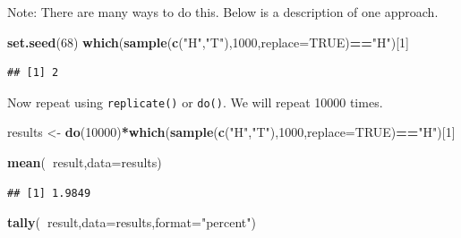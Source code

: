 \documentclass[
]{book}
\newenvironment{Shaded}{\begin{snugshade}}{\end{snugshade}}
\newcommand{\DataTypeTok}[1]{\textcolor[rgb]{0.13,0.29,0.53}{#1}}
\newcommand{\DecValTok}[1]{\textcolor[rgb]{0.00,0.00,0.81}{#1}}
\newcommand{\KeywordTok}[1]{\textcolor[rgb]{0.13,0.29,0.53}{\textbf{#1}}}
\newcommand{\NormalTok}[1]{#1}
\newcommand{\OperatorTok}[1]{\textcolor[rgb]{0.81,0.36,0.00}{\textbf{#1}}}
\newcommand{\OtherTok}[1]{\textcolor[rgb]{0.56,0.35,0.01}{#1}}
\newcommand{\StringTok}[1]{\textcolor[rgb]{0.31,0.60,0.02}{#1}}
\begin{document}
Note: There are many ways to do this. Below is a description of one approach.

\begin{Shaded}
\begin{Highlighting}[]
\KeywordTok{set.seed}\NormalTok{(}\DecValTok{68}\NormalTok{)}
\KeywordTok{which}\NormalTok{(}\KeywordTok{sample}\NormalTok{(}\KeywordTok{c}\NormalTok{(}\StringTok{"H"}\NormalTok{,}\StringTok{"T"}\NormalTok{),}\DecValTok{1000}\NormalTok{,}\DataTypeTok{replace=}\OtherTok{TRUE}\NormalTok{)}\OperatorTok{==}\StringTok{"H"}\NormalTok{)[}\DecValTok{1}\NormalTok{]}
\end{Highlighting}
\end{Shaded}

\begin{verbatim}
## [1] 2
\end{verbatim}

Now repeat using \texttt{replicate()} or \texttt{do()}. We will repeat 10000 times.

\begin{Shaded}
\begin{Highlighting}[]
\NormalTok{results <-}\StringTok{ }\KeywordTok{do}\NormalTok{(}\DecValTok{10000}\NormalTok{)}\OperatorTok{*}\KeywordTok{which}\NormalTok{(}\KeywordTok{sample}\NormalTok{(}\KeywordTok{c}\NormalTok{(}\StringTok{"H"}\NormalTok{,}\StringTok{"T"}\NormalTok{),}\DecValTok{1000}\NormalTok{,}\DataTypeTok{replace=}\OtherTok{TRUE}\NormalTok{)}\OperatorTok{==}\StringTok{"H"}\NormalTok{)[}\DecValTok{1}\NormalTok{]}
\end{Highlighting}
\end{Shaded}

\begin{Shaded}
\begin{Highlighting}[]
\KeywordTok{mean}\NormalTok{(}\OperatorTok{~}\NormalTok{result,}\DataTypeTok{data=}\NormalTok{results)}
\end{Highlighting}
\end{Shaded}

\begin{verbatim}
## [1] 1.9849
\end{verbatim}

\begin{Shaded}
\begin{Highlighting}[]
\KeywordTok{tally}\NormalTok{(}\OperatorTok{~}\NormalTok{result,}\DataTypeTok{data=}\NormalTok{results,}\DataTypeTok{format=}\StringTok{"percent"}\NormalTok{)}
\end{Highlighting}
\end{Shaded}
\end{document}
